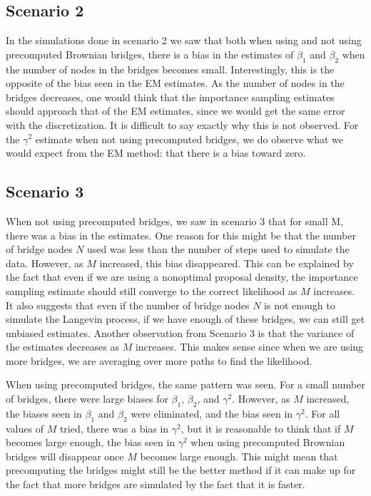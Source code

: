 \subsection{Scenario 2}
\label{subsec: scenario 2 interpretation}

In the simulations done in scenario 2 we saw that both when using and not using precomputed Brownian bridges, there is a bias in the estimates of $\beta_1$ and $\beta_2$ when the number of nodes in the bridges becomes small. Interestingly, this is the opposite of the bias seen in the EM estimates. As the number of nodes in the bridges decreases, one would think that the importance sampling estimates should approach that of the EM estimates, since we would get the same error with the discretization. It is difficult to say exactly why this is not observed. For the $\gamma^2$ estimate when not using precomputed bridges, we do observe what we would expect from the EM method: that there is a bias toward zero.




\subsection{Scenario 3}
\label{subsec: scenario 3 interpretation}


When not using precomputed bridges, we saw in scenario 3  that for small M, there was a bias in the estimates. One reason for this might be that the number of bridge nodes $N$ used was less than the number of steps used to simulate the data. However, as $M$ increased, this bias disappeared. This can be explained by the fact that even if we are using a nonoptimal proposal density, the importance sampling estimate should still converge to the correct likelihood as $M$ increases. It also suggests that even if the number of bridge nodes $N$ is not enough to simulate the Langevin process, if we have enough of these bridges, we can still get unbiased estimates. Another observation from Scenario 3 is that the variance of the estimates decreases as $M$ increases. This makes sense since when we are using more bridges, we are averaging over more paths to find the likelihood.


When using precomputed bridges, the same pattern was seen. For a small number of bridges, there were large biases for $\beta_1$, $\beta_2$, and $\gamma^2$. However, as $M$ increased, the biases seen in $\beta_1$ and $\beta_2$ were eliminated, and the bias seen in $\gamma^2$. For all values of $M$ tried, there was a bias in $\gamma^2$, but it is reasonable to think that if $M$ becomes large enough, the bias seen in $\gamma^2$ when using precomputed Brownian bridges will disappear once $M$ becomes large enough. This might mean that precomputing the bridges might still be the better method if it can make up for the fact that more bridges are simulated by the fact that it is faster.


